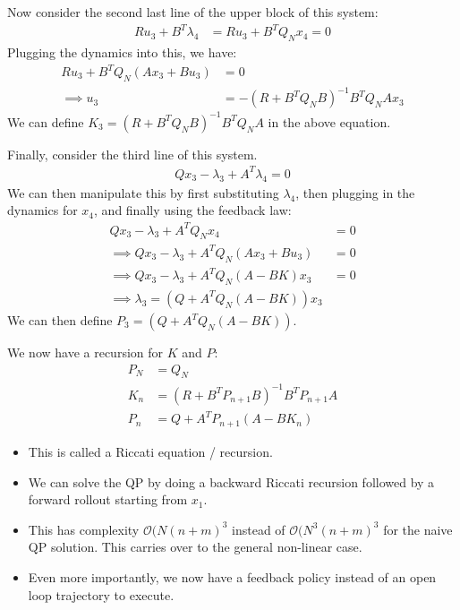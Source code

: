 \noindent
Now consider the second last line of the upper block of this system:
\begin{align}
    R u_3 + B^T \lambda_4 &= R u_3 + B^T Q_N x_4 = 0 
\end{align}
Plugging the dynamics into this, we have: 
\begin{align}
    R u_3 + B^T Q_N (A x_3 + B u_3) &= 0 \\
    \implies u_3 &= - (R + B^T Q_N B )^{-1} B^T Q_N A x_3
\end{align}
We can define $K_3 = (R + B^T Q_N B )^{-1} B^T Q_N A$ in the above equation. 

\noindent
Finally, consider the third line of this system. 
\begin{align}
    Q x_3 - \lambda_3 + A^T \lambda_4 = 0
\end{align}
We can then manipulate this by first substituting $\lambda_4$, then plugging in the dynamics for $x_4$, and finally using the feedback law:
\begin{align}
    Q x_3 - \lambda_3 + A^T Q_N x_4 &= 0 \\
    \implies Q x_3 - \lambda_3 + A^T Q_N (A x_3 + B u_3) &= 0 \\
    \implies Q x_3 - \lambda_3 + A^T Q_N (A - B K) x_3 &= 0 \\
    \implies \lambda_3 = (Q + A^T Q_N (A- BK)) x_3
\end{align}
We can then define $P_3 =  (Q + A^T Q_N (A- BK))$. 

\noindent
We now have a recursion for $K$ and $P$: 
\begin{align}
    P_N &= Q_N \\
    K_n &= (R + B^T P_{n+1} B)^{-1} B^T P_{n+1} A \\
    P_n &= Q + A^T P_{n+1} (A - BK_n)
\end{align}

\begin{itemize}
    \item This is called a Riccati equation / recursion.
    \item We can solve the QP by doing a backward Riccati recursion followed by a forward rollout starting from $x_1$.
    \item This has complexity $\mathcal{O} (N (n+m)^3$ instead of $\mathcal{O} (N^3 (n+m)^3$ for the naive QP solution. 
    This carries over to the general non-linear case. 
    \item Even more importantly, we now have a feedback policy instead of an open loop trajectory to execute. 
\end{itemize}

